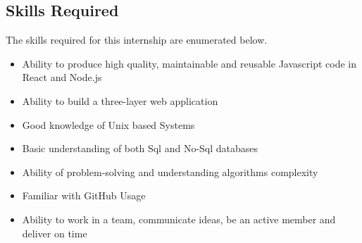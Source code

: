 \subsection{ Skills Required }
The skills required for this internship are enumerated below.
\begin{itemize}
	\item Ability to produce high quality, maintainable and reusable Javascript code in React and Node.js
	\item Ability to build a three-layer web application
	\item Good knowledge of Unix based Systems
	\item Basic understanding of both Sql and No-Sql databases
	\item Ability of problem-solving and understanding algorithms complexity
	\item Familiar with GitHub Usage
	\item Ability to work in a team, communicate ideas, be an active member and deliver on time
\end{itemize}
